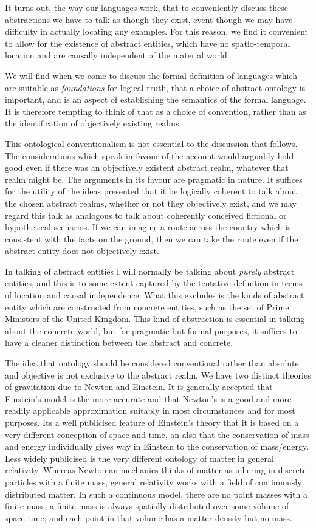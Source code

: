 \documentclass[10pt,titlepage]{book}
\begin{document}
It turns out, the way our languages work, that to conveniently discuss these abstractions we have to talk as though they exist, event though we may have difficulty in actually locating any examples.
For this reason, we find it convenient to allow for the existence of abstract entities, which have no spatio-temporal location and are causally independent of the material world.

We will find when we come to discuss the formal definition of languages which are suitable as \emph{foundations} for logical truth, that a choice of abstract ontology is important, and is an aspect of establishing the semantics of the formal language.
It is therefore tempting to think of that as a choice of convention, rather than as the identification of objectively existing realms.

This ontological conventionalism is not essential to the discussion that follows.
The considerations which speak in favour of the account would arguably hold good even if there was an objectively existent abstract realm, whatever that realm might be.
The arguments in its favour are pragmatic in nature.
It suffices for the utility of the ideas presented that it be logically coherent to talk about the chosen abstract realms, whether or not they objectively exist, and we may regard this talk as analogous to talk about coherently conceived fictional or hypothetical scenarios.
If we can imagine a route across the country which is consistent with the facts on the ground, then we can take the route even if the abstract entity does not objectively exist.

In talking of abstract entities I will normally be talking about \emph{purely} abstract entities, and this is to some extent captured by the tentative definition in terms of location and causal independence.
What this excludes is the kinds of abstract entity which are constructed from concrete entities, such as the set of Prime Ministers of the United Kingdom.
This kind of abstraction is essential in talking about the concrete world, but for pragmatic but formal purposes, it suffices to have a cleaner distinction between the abstract and concrete.

The idea that ontology should be considered conventional rather than absolute and objective is not exclusive to the abstract realm.
We have two distinct theories of gravitation due to Newton and Einstein.
It is generally accepted that Einstein's model is the more accurate and that Newton's is a good and more readily applicable approximation suitably in most circumstances and for most purposes.
Its a well publicised feature of Einstein's theory that it is based on a very different conception of space and time, an also that the conservation of mass and energy individually gives way in Einstein to the conservation of mass/energy.
Less widely publicised is the very different ontology of matter in
general relativity.
Whereas Newtonian mechanics thinks of matter as inhering in discrete particles with a finite mass, general relativity works with a field of continuously distributed matter.
In such a continuous model, there are no point masses with a finite mass, a finite mass is always spatially distributed over some volume of space time, and each point in that volume has a matter density but no mass.
\end{document}
